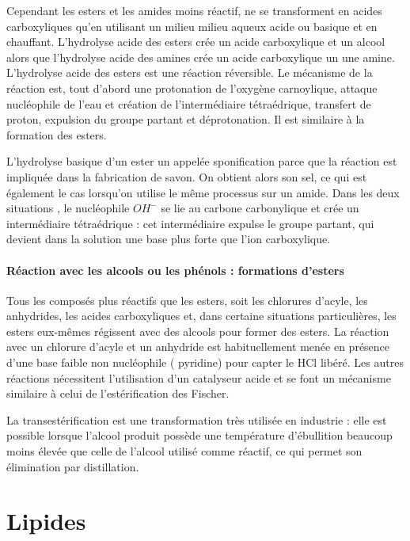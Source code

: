 Cependant les esters et les amides moins réactif, ne se transforment en acides carboxyliques  qu'en utilisant un milieu milieu aqueux acide ou basique et en chauffant.
L'hydrolyse acide des esters crée un acide carboxylique  et un alcool alors que l'hydrolyse acide des amines crée un acide carboxylique un une amine.
L'hydrolyse acide des esters est une réaction réversible.
Le mécanisme de la réaction est, tout d'abord une protonation de l'oxygène carnoylique, attaque nucléophile de l'eau et création de l'intermédiaire tétraédrique, transfert de proton, expulsion du groupe partant et déprotonation.
Il est similaire à la formation des esters.



L'hydrolyse basique d'un ester un appelée sponification parce que la réaction est impliquée dans la fabrication de savon.
On obtient alors son sel, ce qui est également le cas lorsqu'on utilise le même processus sur un amide.
Dans les deux situations , le nucléophile $OH^-$ se lie au carbone carbonylique et crée un intermédiaire tétraédrique : cet intermédiaire expulse le groupe partant, qui devient dans la solution une base plus forte que l'ion carboxylique.

\subsection{Réaction avec les alcools ou les phénols : formations d'esters}

Tous les composés plus réactifs que les esters, soit les chlorures d'acyle, les anhydrides, les acides carboxyliques et, dans certaine situations particulières, les esters eux-mêmes régissent avec des alcools pour former des esters.
La réaction avec un chlorure d'acyle et un anhydride est habituellement menée en présence d'une base faible non nucléophile ( pyridine) pour capter le HCl libéré.
Les autres réactions nécessitent l'utilisation d'un catalyseur acide et se font un mécanisme similaire à celui de l'estérification des Fischer.


La transestérification est une transformation très utilisée en industrie : elle est possible lorsque l'alcool produit possède une température d'ébullition beaucoup moins élevée que celle de l'alcool utilisé comme réactif, ce qui permet son élimination par distillation.

\part{Lipides}

